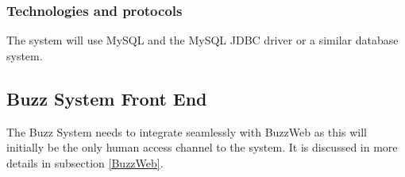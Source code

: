 \subsubsection{Technologies and protocols}
The system will use MySQL and  the MySQL JDBC driver or a similar database system.

\subsection{Buzz System Front End}
The Buzz System needs to integrate seamlessly with BuzzWeb as this will initially be the only human access channel to the system. It is discussed in more details in subsection \ref{BuzzWeb}.

